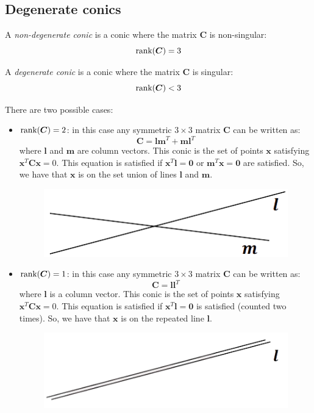 \documentclass[12pt, a4paper]{report}
\begin{document}
    \subsection{Degenerate conics}
    \begin{definition}
        A \emph{non-degenerate conic} is a conic where the matrix $\boldsymbol{C}$ is non-singular: 
        \[\textnormal{rank}(\boldsymbol{C})=3\]

        A \emph{degenerate conic} is a conic where the matrix $\boldsymbol{C}$ is singular: 
        \[\textnormal{rank}(\boldsymbol{C}) < 3\]
    \end{definition}
    There are two possible cases: 
    \begin{itemize}
        \item $\textnormal{rank}(\boldsymbol{C}) = 2$: in this case any symmetric $3 \times 3$ matrix $\boldsymbol{C}$ can be written as:
            \[\boldsymbol{C}=\boldsymbol{lm}^T+\boldsymbol{ml}^T\]
            where $\boldsymbol{l}$ and $\boldsymbol{m}$ are column vectors. This conic is the set of points $\boldsymbol{x}$ satisfying $\boldsymbol{x}^T\boldsymbol{C}\boldsymbol{x}=0$. This equation is 
            satisfied if $\boldsymbol{x}^T\boldsymbol{l}=\boldsymbol{0}$ or $\boldsymbol{m}^T\boldsymbol{x}=\boldsymbol{0}$ are satisfied. So, we have that $\boldsymbol{x}$ is on the set union of lines 
            $\boldsymbol{l}$ and $\boldsymbol{m}$.
            \begin{figure}[H]
                \centering
                \includegraphics[width=0.5\linewidth]{images/inters.png}
            \end{figure}
        \item $\textnormal{rank}(\boldsymbol{C}) = 1$: in this case any symmetric $3 \times 3$ matrix $\boldsymbol{C}$ can be written as:
            \[\boldsymbol{C}=\boldsymbol{ll}^T\]
            where $\boldsymbol{l}$ is a column vector. This conic is the set of points $\boldsymbol{x}$ satisfying $\boldsymbol{x}^T\boldsymbol{C}\boldsymbol{x}=0$. This equation is 
            satisfied if $\boldsymbol{x}^T\boldsymbol{l}=\boldsymbol{0}$ is satisfied (counted two times). So, we have that $\boldsymbol{x}$ is on the repeated line $\boldsymbol{l}$. 
            \begin{figure}[H]
                \centering
                \includegraphics[width=0.5\linewidth]{images/rep.png}
            \end{figure}
    \end{itemize}
\end{document}
